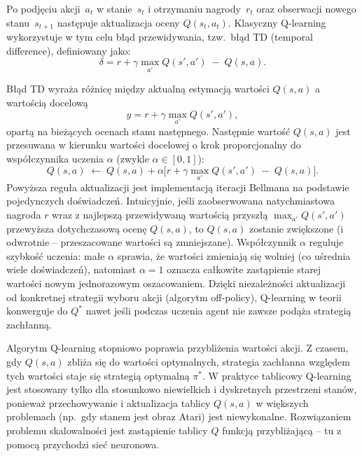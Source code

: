 \documentclass[a4paper,12pt]{article}
\begin{document}
Po podjęciu akcji~$a_t$ w stanie~$s_t$ i otrzymaniu nagrody~$r_t$ oraz obserwacji nowego stanu~$s_{t+1}$ następuje aktualizacja oceny $Q(s_t,a_t)$. Klasyczny Q-learning wykorzystuje w tym celu błąd przewidywania, tzw.\ błąd TD (temporal difference), definiowany jako:
\begin{equation}
\delta = r + \gamma \max_{a'} Q(s',a') \;-\; Q(s,a).
\end{equation}

Błąd TD wyraża różnicę między aktualną estymacją wartości \(Q(s,a)\) a wartością docelową
\begin{equation}
y = r + \gamma \max_{a'} Q(s',a'),
\end{equation}
opartą na bieżących ocenach stanu następnego. Następnie wartość \(Q(s,a)\) jest przesuwana w kierunku wartości docelowej o krok proporcjonalny do współczynnika uczenia \(\alpha\) (zwykle \(\alpha \in [0,1]\)):
\begin{equation}
Q(s,a) \;\leftarrow\; Q(s,a) + \alpha\bigl[r + \gamma \max_{a'} Q(s',a') \;-\; Q(s,a)\bigr].
\end{equation}
Powyższa reguła aktualizacji jest implementacją iteracji Bellmana na podstawie pojedynczych doświadczeń. Intuicyjnie, jeśli zaobserwowana natychmiastowa nagroda \(r\) wraz z najlepszą przewidywaną wartością przyszłą \(\max_{a'} Q(s',a')\) przewyższa dotychczasową ocenę \(Q(s,a)\), to \(Q(s,a)\) zostanie zwiększone (i odwrotnie – przeszacowane wartości są zmniejszane). Współczynnik \(\alpha\) reguluje szybkość uczenia: małe \(\alpha\) sprawia, że wartości zmieniają się wolniej (co uśrednia wiele doświadczeń), natomiast \(\alpha = 1\) oznacza całkowite zastąpienie starej wartości nowym jednorazowym oszacowaniem. Dzięki niezależności aktualizacji od konkretnej strategii wyboru akcji (algorytm off-policy), Q-learning w teorii konwerguje do \(Q^*\) nawet jeśli podczas uczenia agent nie zawsze podąża strategią zachłanną.

Algorytm Q-learning stopniowo poprawia przybliżenia wartości akcji. Z czasem, gdy \(Q(s,a)\) zbliża się do wartości optymalnych, strategia zachłanna względem tych wartości staje się strategią optymalną \(\pi^*\). W praktyce tablicowy Q-learning jest stosowany tylko dla stosunkowo niewielkich i dyskretnych przestrzeni stanów, ponieważ przechowywanie i aktualizacja tablicy \(Q(s,a)\) w większych problemach (np.\ gdy stanem jest obraz Atari) jest niewykonalne. Rozwiązaniem problemu skalowalności jest zastąpienie tablicy \(Q\) funkcją przybliżającą – tu z pomocą przychodzi sieć neuronowa.
\end{document}
